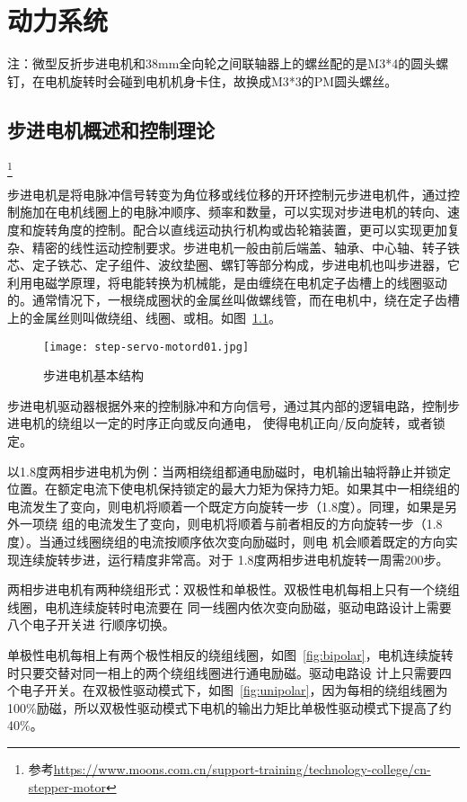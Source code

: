 \chapter{动力系统}
\label{cha:Motor}

注：微型反折步进电机和38mm全向轮之间联轴器上的螺丝配的是M3*4的圆头螺钉，在电机旋转时会碰到电机机身卡住，故换成M3*3的PM圆头螺丝。

\section{步进电机概述和控制理论}

\footnote{参考\url{https://www.moons.com.cn/support-training/technology-college/cn-stepper-motor}}

步进电机是将电脉冲信号转变为角位移或线位移的开环控制元步进电机件，通过控制施加在电机线圈上的电脉冲顺序、频率和数量，可以实现对步进电机的转向、速度和旋转角度的控制。配合以直线运动执行机构或齿轮箱装置，更可以实现更加复杂、精密的线性运动控制要求。步进电机一般由前后端盖、轴承、中心轴、转子铁芯、定子铁芯、定子组件、波纹垫圈、螺钉等部分构成，步进电机也叫步进器，它利用电磁学原理，将电能转换为机械能，是由缠绕在电机定子齿槽上的线圈驱动的。通常情况下，一根绕成圈状的金属丝叫做螺线管，而在电机中，绕在定子齿槽上的金属丝则叫做绕组、线圈、或相。如图~\ref{fig:Stepper-Motor-Open}。

\begin{figure}[htbp]
    \centering
    \texttt{[image: step-servo-motord01.jpg]}
    \caption{步进电机基本结构}
    \label{fig:Stepper-Motor-Open}
\end{figure}

步进电机驱动器根据外来的控制脉冲和方向信号，通过其内部的逻辑电路，控制步进电机的绕组以一定的时序正向或反向通电， 使得电机正向/反向旋转，或者锁定。

以1.8度两相步进电机为例：当两相绕组都通电励磁时，电机输出轴将静止并锁定位置。在额定电流下使电机保持锁定的最大力矩为保持力矩。如果其中一相绕组的电流发生了变向，则电机将顺着一个既定方向旋转一步（1.8度）。同理，如果是另外一项绕 组的电流发生了变向，则电机将顺着与前者相反的方向旋转一步（1.8度）。当通过线圈绕组的电流按顺序依次变向励磁时，则电 机会顺着既定的方向实现连续旋转步进，运行精度非常高。对于 1.8度两相步进电机旋转一周需200步。

两相步进电机有两种绕组形式：双极性和单极性。双极性电机每相上只有一个绕组线圈，电机连续旋转时电流要在 同一线圈内依次变向励磁，驱动电路设计上需要八个电子开关进 行顺序切换。

单极性电机每相上有两个极性相反的绕组线圈，如图~\ref{fig:bipolar}，电机连续旋转时只要交替对同一相上的两个绕组线圈进行通电励磁。驱动电路设 计上只需要四个电子开关。在双极性驱动模式下，如图~\ref{fig:unipolar}，因为每相的绕组线圈为100\%励磁，所以双极性驱动模式下电机的输出力矩比单极性驱动模式下提高了约 40\%。

